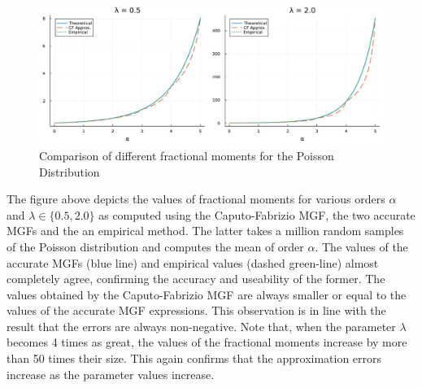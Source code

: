 \begin{figure}[H]
    \centering
    \includegraphics[width=1.0\textwidth]{figures/value_comparison.pdf}
    \caption{Comparison of different fractional moments for the Poisson Distribution}
    \label{fig:poisson_plot_values}
\end{figure}
The figure above depicts the values of fractional moments for various orders \(\alpha\) and \(\lambda \in \{0.5, 2.0\} \) as computed using the Caputo-Fabrizio MGF, the two accurate MGFs and the an empirical method. The latter takes a million random samples of the Poisson distribution and computes the mean of order \(\alpha\). The values of the accurate MGFs (blue line) and empirical values (dashed green-line) almost completely agree, confirming the accuracy and useability of the former. The values obtained by the Caputo-Fabrizio MGF are always smaller or equal to the values of the accurate MGF expressions. This observation is in line with the result that the errors are always non-negative. Note that, when the parameter \(\lambda\) becomes 4 times as great, the values of the fractional moments increase by more than 50 times their size. This again confirms that the approximation errors increase as the parameter values increase.

